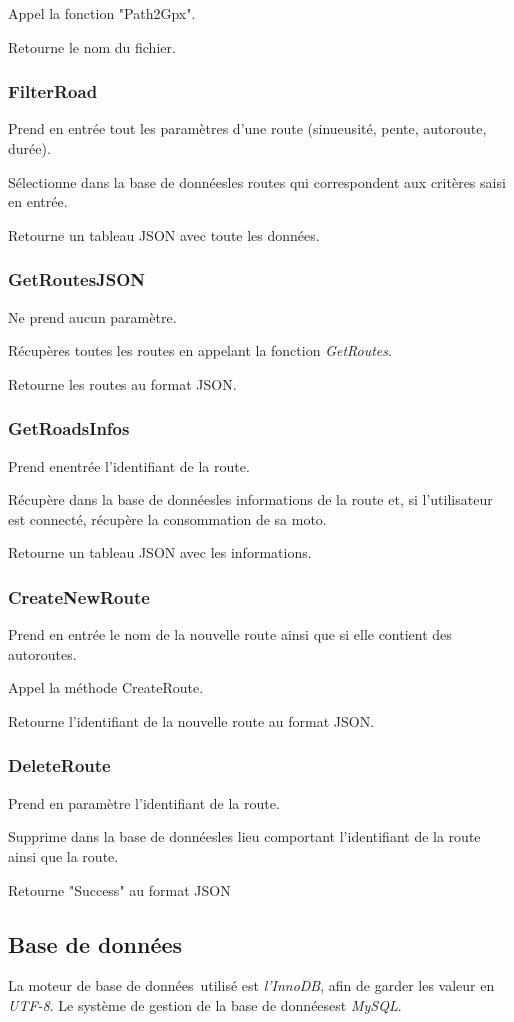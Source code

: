 \documentclass[a4paper]{article}
\newcommand{\bdd}{base de données}
\begin{document}
Appel la fonction "Path2Gpx".

Retourne le nom du fichier.

\subsubsection{FilterRoad}
Prend en entrée tout les paramètres d'une route (sinueusité, pente, autoroute, durée).

Sélectionne dans la \bdd les routes qui correspondent aux critères saisi en entrée.

Retourne un tableau JSON avec toute les données.


\subsubsection{GetRoutesJSON}
Ne prend aucun paramètre.

Récupères toutes les routes en appelant la fonction \emph{GetRoutes}.

Retourne les routes au format JSON.


\subsubsection{GetRoadsInfos}
Prend enentrée l'identifiant de la route.

Récupère dans la \bdd les informations de la route et, si l'utilisateur est connecté, récupère la consommation de sa moto.

Retourne un tableau JSON avec les informations.

\subsubsection{CreateNewRoute}
Prend en entrée le nom de la nouvelle route ainsi que si elle contient des autoroutes.

Appel la méthode CreateRoute.

Retourne l'identifiant de la nouvelle route au format JSON.

\subsubsection{DeleteRoute}
Prend en paramètre l'identifiant de la route.

Supprime dans la \bdd les lieu comportant l'identifiant de la route ainsi que la route.

Retourne "Success" au format JSON
\newpage
\subsection{Base de données}
La moteur de \bdd \ utilisé est \emph{l'InnoDB}, afin de garder les valeur en \emph{UTF-8}.
Le système de gestion de la \bdd est \emph{MySQL}.
\end{document}
